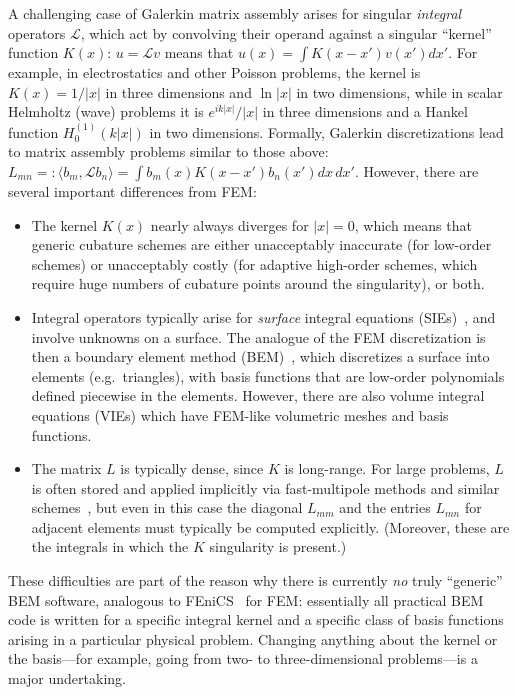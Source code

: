 \fi

A challenging case of Galerkin matrix assembly arises for singular
\emph{integral} operators $\mathcal{L}$, which act by
convolving their operand against a singular ``kernel'' function
$K(x)$: $u = \mathcal{L} v$ means that $u(x) = \int K(x - x') v(x')
dx'$.
For example, in electrostatics and other Poisson problems, the
kernel is $K(x) = 1/|x|$ in three dimensions and $\ln |x|$ in two
dimensions, while in scalar Helmholtz (wave) problems it is
$e^{ik|x|}/|x|$ in three dimensions and a Hankel function
$H^{(1)}_0(k|x|)$ in two dimensions.
Formally, Galerkin discretizations lead to matrix assembly problems
similar to those above:
$L_{mn} =: \langle b_m, \mathcal{L} b_n \rangle = \int b_m(x) K(x - x') b_n(x') dx\,dx'$.
However, there are several important differences from FEM:

\begin{itemize}
\item The kernel $K(x)$ nearly always diverges for $|x|=0$, which means that generic
cubature schemes are either unacceptably inaccurate (for low-order schemes) or
unacceptably costly (for adaptive high-order schemes, which require huge numbers
of cubature points around the singularity), or both.

\item Integral operators typically arise for \emph{surface} integral
equations (SIEs)~\cite{Bonnet99,Chew09}, and involve unknowns on a surface.
The analogue of the FEM discretization is then a boundary element method
(BEM)~\cite{Bonnet99,Chew09}, which discretizes a surface into elements
(e.g.\ triangles), with basis functions that are low-order
polynomials defined piecewise in the elements.
However, there are also volume integral equations (VIEs) which have FEM-like
volumetric meshes and basis functions.

\item The matrix $L$ is typically dense, since $K$ is long-range.
For large problems, $L$ is often stored and applied implicitly via
fast-multipole methods and similar schemes~\cite{Chew01,Liu14}, but even in this
case the diagonal $L_{mm}$ and the entries $L_{mn}$ for adjacent
elements must typically be computed explicitly.
(Moreover, these are the integrals in which the $K$ singularity is present.)
\end{itemize}

These difficulties are part of the reason why there is currently \emph{no}
truly ``generic'' BEM software, analogous to FEniCS~\cite{FEniCS12} for FEM: essentially
all practical BEM code is written for a specific integral kernel and
a specific class of basis functions arising in a particular physical problem.
Changing anything about the kernel or the basis---for example, going
from two- to three-dimensional problems---is a major undertaking.


